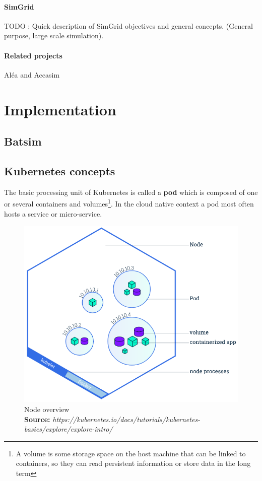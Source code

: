 \documentclass[12pt, a4paper]{memoir}
\newcommand*{\captionsource}[2]{%
    \caption[{#1}]{%
        #1%
        \\\hspace{\linewidth}%
	\textbf{Source:} \textit{#2}%
    }%
}
\begin{document}
\subsubsection{SimGrid}

 TODO : Quick description of SimGrid objectives and general concepts. (General
 purpose, large scale simulation).



\subsubsection{Related projects}

 Aléa and Accasim

\chapter{Implementation}

\section{Batsim}

\section{Kubernetes concepts}

The basic processing unit of Kubernetes is called a \textbf{pod} which is
composed of one or several containers and volumes\footnote{A volume is some
	storage space on the host machine that can be linked to containers, so
	they can read persistent information or store data in the long term}.
In the cloud native context a pod most often hosts a service or micro-service.

\begin{figure}[h]
	\centering
	\includegraphics[scale=0.5]{./imgs/node-overview.png}
	\captionsource{Node overview}{https://kubernetes.io/docs/tutorials/kubernetes-basics/explore/explore-intro/}
	\label{fig:node-overview}
\end{figure}
\end{document}
